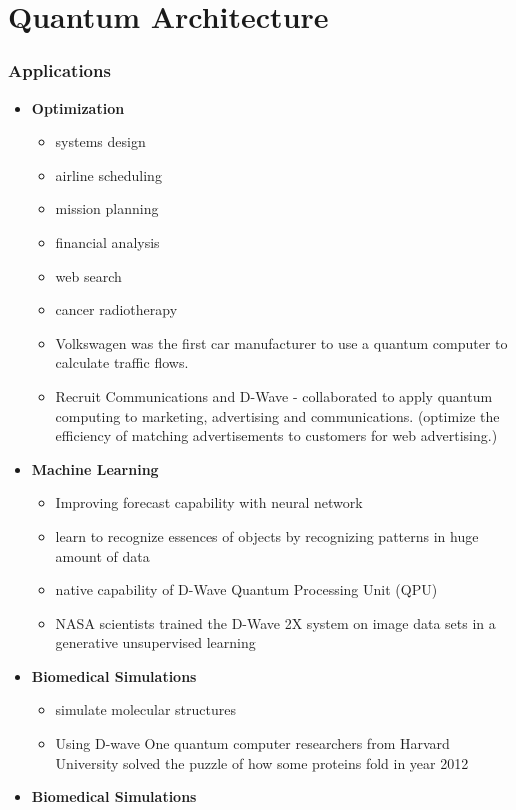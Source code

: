 \documentclass{beamer}
\begin{document}
\section{Quantum Architecture}

\begin{frame}[allowframebreaks]
\frametitle{Applications}
	\begin{itemize}
		\item \textbf{Optimization}
			\begin{itemize}
				\item systems design
				\item airline scheduling
				\item mission planning
				\item financial analysis
				\item web search
				\item cancer radiotherapy
				\item Volkswagen was the first car manufacturer to use a quantum computer to calculate traffic flows. 
				\item Recruit Communications and D-Wave - collaborated to apply quantum computing to marketing, advertising and communications. (optimize the efficiency of matching advertisements to customers for web advertising.)
			\end{itemize}
		\newpage
		
		\item \textbf{Machine Learning}
		\begin{itemize}
			\item Improving forecast capability with neural network
			\item learn to recognize essences of objects by recognizing patterns in huge amount of data
			\item native capability of D-Wave Quantum Processing Unit (QPU)
			\item NASA scientists trained the D-Wave 2X system on image data sets in a generative unsupervised learning 
		\end{itemize}
		\newpage
		
		\item \textbf{Biomedical Simulations}
		\begin{itemize}
			\item simulate molecular structures
			\item Using D-wave One quantum computer researchers from Harvard University solved the puzzle of how some proteins fold in year 2012 
		\end{itemize}
		\item \textbf{Biomedical Simulations}

	\end{itemize}
\end{frame}
\end{document}

